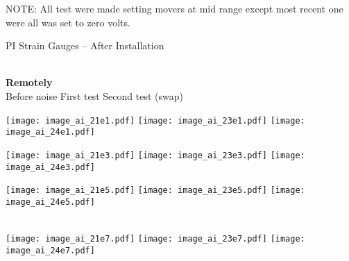 NOTE:
 All test were made setting movers at mid range except most recent one were all was set to zero volts.\par
PI Strain Gauges -- After Installation\par
{}\\
\hspace*{4.4cm}\textbf{Remotely}\\
\hspace*{0.8cm}Before noise \hspace{1.8cm} First test \hspace{2.0cm}Second test (swap)\par
 \texttt{[image: image\_ai\_21e1.pdf]}
  \texttt{[image: image\_ai\_23e1.pdf]}
  \texttt{[image: image\_ai\_24e1.pdf]}\par
\texttt{[image: image\_ai\_21e3.pdf]}
 \texttt{[image: image\_ai\_23e3.pdf]}
 \texttt{[image: image\_ai\_24e3.pdf]}\par
\texttt{[image: image\_ai\_21e5.pdf]}
 \texttt{[image: image\_ai\_23e5.pdf]}
 \texttt{[image: image\_ai\_24e5.pdf]}\par
 \vspace{1cm}
\\
  \texttt{[image: image\_ai\_21e7.pdf]}
 \texttt{[image: image\_ai\_23e7.pdf]}
 \texttt{[image: image\_ai\_24e7.pdf]}\par
 
